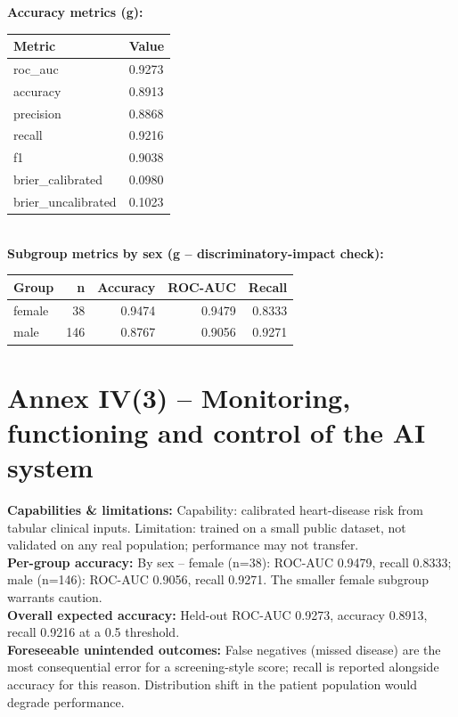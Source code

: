 \documentclass[11pt,a4paper]{article}
\begin{document}
\textbf{Accuracy metrics (g):}\\[2pt]
\begin{tabular}{ll}\toprule Metric & Value \\ \midrule
roc\_auc & 0.9273 \\
accuracy & 0.8913 \\
precision & 0.8868 \\
recall & 0.9216 \\
f1 & 0.9038 \\
brier\_calibrated & 0.0980 \\
brier\_uncalibrated & 0.1023 \\
\bottomrule\end{tabular}\\[4pt]
\textbf{Subgroup metrics by sex (g -- discriminatory-impact check):}\\[2pt]
\begin{tabular}{lrrrr}\toprule Group & n & Accuracy & ROC-AUC & Recall \\ \midrule
female & 38 & 0.9474 & 0.9479 & 0.8333 \\
male & 146 & 0.8767 & 0.9056 & 0.9271 \\
\bottomrule\end{tabular}
\section*{Annex IV(3) -- Monitoring, functioning and control of the AI system}
\textbf{Capabilities \& limitations:} Capability: calibrated heart-disease risk from tabular clinical inputs. Limitation: trained on a small public dataset, not validated on any real population; performance may not transfer.\\

\textbf{Per-group accuracy:} By sex -- female (n=38): ROC-AUC 0.9479, recall 0.8333; male (n=146): ROC-AUC 0.9056, recall 0.9271. The smaller female subgroup warrants caution.\\

\textbf{Overall expected accuracy:} Held-out ROC-AUC 0.9273, accuracy 0.8913, recall 0.9216 at a 0.5 threshold.\\

\textbf{Foreseeable unintended outcomes:} False negatives (missed disease) are the most consequential error for a screening-style score; recall is reported alongside accuracy for this reason. Distribution shift in the patient population would degrade performance.\\
\end{document}

